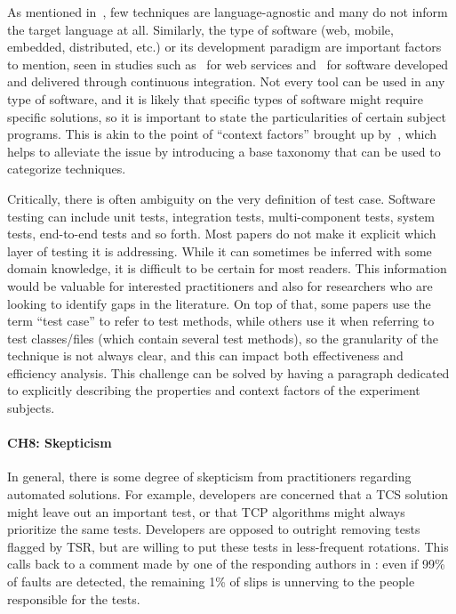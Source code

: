 As mentioned in~, few \rt techniques are language-agnostic and many do not inform the target language at all.
Similarly, the type of software (web, mobile, embedded, distributed, etc.) or its development paradigm are important factors to mention, seen in studies such as~ for web services and~ for software developed and delivered through continuous integration.
Not every tool can be used in any type of software, and it is likely that specific types of software might require specific solutions, so it is important to state the particularities of certain subject programs.
This is akin to the point of ``context factors'' brought up by~\citet{bin_ali_search_2019}, which helps to alleviate the issue by introducing a base taxonomy that can be used to categorize techniques.

Critically, there is often ambiguity on the very definition of test case.
Software testing can include unit tests, integration tests, multi-component tests, system tests, end-to-end tests and so forth.
Most papers do not make it explicit which layer of testing it is addressing. While it can sometimes be inferred with some domain knowledge, it is difficult to be certain for most readers.
This information would be valuable for interested practitioners and also for researchers who are looking to identify gaps in the literature.
On top of that, some papers use the term ``test case'' to refer to test methods, while others use it when referring to test classes/files (which contain several test methods), so the granularity of the technique is not always clear, and this can impact both effectiveness and efficiency analysis.
This challenge can be solved by having a paragraph dedicated to explicitly describing the properties and context factors of the experiment subjects.

\paragraph{CH8: Skepticism}
In general, there is some degree of skepticism from practitioners regarding automated solutions.
For example, developers are concerned that a TCS solution might leave out an important test, or that TCP algorithms might always prioritize the same tests.
Developers are opposed to outright removing tests flagged by TSR, but are willing to put these tests in less-frequent rotations.
This calls back to a comment made by one of the responding authors in : even if 99\% of faults are detected, the remaining 1\% of slips is unnerving to the people responsible for the tests.

